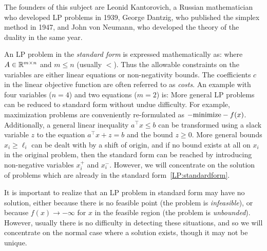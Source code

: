 The founders of this subject are Leonid Kantorovich, a Russian mathematician who developed LP problems in 1939, George Dantzig, who published the simplex method in 1947, and John von Neumann, who developed the theory of the duality in the same year.

An LP problem in the {\em standard form} is expressed mathematically as:
where $A\in\mathbb{R}^{m\times n}$ and $m\le n$ (usually $<$). Thus the allowable constraints on the variables are either linear equations or non-negativity bounds. The coefficients $c$ in the linear objective function are often referred to as {\em costs}. An example with four variables ($n=4$) and two equations ($m=2$) is:
More general LP problems can be reduced to standard form without undue difficulty. For example, maximization problems are conveniently re-formulated as $-\hbox{minimize} -f(x)$. Additionally, a general linear inequality $a^\top x \le b$ can be transformed using a slack variable $z$ to the equation $a^\top x + z = b$ and the bound $z\ge 0$. More general bounds $x_i\ge \ell_i$ can be dealt with by a shift of origin, and if no bound exists at all on $x_i$ in the original problem, then the standard form can be reached by introducing non-negative variables $x_i^+$ and $x_i^-$. However, we will concentrate on the solution of problems which are already in the standard form~\eqref{LP:standardform}.

It is important to realize that an LP problem in standard form may have no solution, either because there is no feasible point (the problem is {\em infeasible}), or because $f(x)\to-\infty$ for $x$ in the feasible region (the problem is {\em unbounded}). However, usually there is no difficulty in detecting these situations, and so we will concentrate on the normal case where a solution exists, though it may not be unique.

